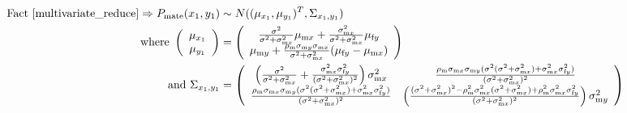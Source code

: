 \documentclass{article}
\newcommand{\x}[1]{\text{#1}}
\begin{document}
\begin{align*}
\text{ Fact \ref{multivariate_reduce}}\Rightarrow P_\text{mate}(x_1,y_1)&\sim N((\mu_{x_1},\mu_{y_1})^T,\Sigma_{x_1,y_1}) 
\\ \text{ where } \left(\begin{array}{c}\mu_{x_1} \\ \mu_{y_1} \end{array}\right)&=\left(\begin{array}{c}\frac{\sigma^2}{\sigma^2+\sigma_{\x{m}x}^2}\mu_{\x{m}x}+\frac{\sigma_{\x{m}x}^2}{\sigma^2+\sigma_{\x{m}x}^2}\mu_{\x{f}y} \\ \mu_{\x{m}y}+\frac{\rho_\x{m}\sigma_{\x{m}y}\sigma_{\x{m}x}}{\sigma^2+\sigma_{\x{m}x}^2}(\mu_{\x{f}y}-\mu_{\x{m}x}) \end{array}\right)
\\ \text{ and } \Sigma_{x_1,y_1}&=\left(\begin{array}{cc}\left(\frac{\sigma^2}{\sigma^2+\sigma_{\x{m}x}^2}+\frac{\sigma_{\x{m}x}^2\sigma_{\x{f}y}^2}{(\sigma^2+\sigma_{\x{m}x}^2)^2}\right)\sigma_{\x{m}x}^2 & \frac{\rho_\x{m}\sigma_{\x{m}x}\sigma_{\x{m}y}(\sigma^2(\sigma^2+\sigma_{\x{m}x}^2)+\sigma_{\x{m}x}^2\sigma_{\x{f}y}^2)}{(\sigma^2+\sigma_{\x{m}x}^2)^2} \\ \frac{\rho_\x{m}\sigma_{\x{m}x}\sigma_{\x{m}y}(\sigma^2(\sigma^2+\sigma_{\x{m}x}^2)+\sigma_{\x{m}x}^2\sigma_{\x{f}y}^2)}{(\sigma^2+\sigma_{\x{m}x}^2)^2} & \left(\frac{(\sigma^2+\sigma_{\x{m}x}^2)^2-\rho_\x{m}^2\sigma_{\x{m}x}^2(\sigma^2+\sigma_{\x{m}x}^2)+\rho_\x{m}^2\sigma_{\x{m}x}^2\sigma_{\x{f}y}^2}{(\sigma^2+\sigma_{\x{m}x}^2)^2}\right)\sigma_{\x{m}y}^2 \end{array}\right)
\end{align*}
\end{document}
